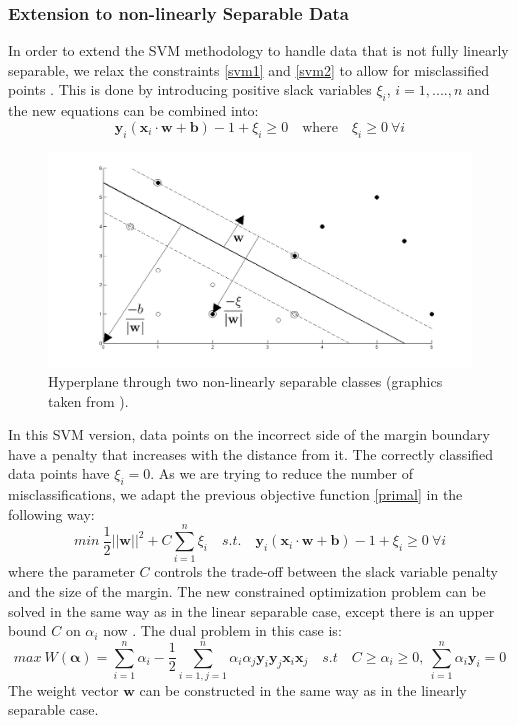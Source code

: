 \documentclass[a4paper,11pt,oneside]{article}
\begin{document}
\subsubsection*{Extension to non-linearly Separable Data}
In order to extend the SVM methodology to handle data that is not fully linearly separable, we relax 
the constraints \ref{svm1} and \ref{svm2} to allow for misclassified points \cite{fletcher2009support}. This is done by introducing
positive slack variables $\xi_i$, $i=1,....,n$ and the new equations can be combined into:
\begin{equation}
  \mathbf{y}_i(\mathbf{x}_i\cdot\mathbf{w}+\mathbf{b}) - 1 + \xi_i\geq 0 \quad \text{where} \quad \xi_i\geq 0\ \forall i
\end{equation}
\begin{figure}[H]
  \includegraphics[scale=0.3]{nonlinear}
  \centering
  \caption{Hyperplane through two non-linearly separable classes (graphics taken from \cite{fletcher2009support}).}
\end{figure}
In this SVM version, data points on the incorrect side of the margin boundary have a penalty that increases with the distance
from it. The correctly classified data points have $\xi_i=0$. As we are trying to reduce the number of misclassifications,
we adapt the previous objective function \ref{primal} in the following way:
\begin{equation}
  min \ \frac{1}{2}||\mathbf{w}||^2+C\sum_{i=1}^n\xi_i\quad s.t. \quad \mathbf{y}_i(\mathbf{x}_i\cdot\mathbf{w}+\mathbf{b}) - 1 + \xi_i\geq 0 \ \forall i
\end{equation}
where the parameter $C$ controls the trade-off between the slack variable penalty and the size of the margin.
The new constrained optimization problem can be solved in the same way as in the linear separable case, except
there is an upper bound $C$ on $\alpha_i$ now \cite{law2006simple}. The dual problem in this case is:
\begin{equation}
  max \ W(\mathbf{\alpha}) = \sum_{i=1}^n \alpha_i - \frac{1}{2} \sum_{i=1,j=1}^n \alpha_i \alpha_j \mathbf{y}_i\mathbf{y}_j\mathbf{x}_i\mathbf{x}_j
  \quad s.t \quad C\geq\alpha_i \geq 0,\ \sum_{i=1}^n \alpha_i\mathbf{y}_i = 0
\end{equation}
The weight vector $\mathbf{w}$ can be constructed in the same way as in the linearly separable case.
\end{document}
